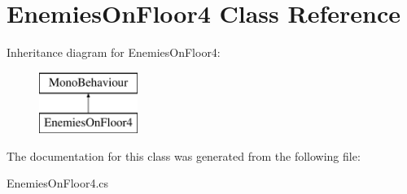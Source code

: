 \hypertarget{class_enemies_on_floor4}{}\section{Enemies\+On\+Floor4 Class Reference}
\label{class_enemies_on_floor4}
Inheritance diagram for Enemies\+On\+Floor4\+:\begin{figure}[H]
\begin{center}
\leavevmode
\includegraphics[height=2.000000cm]{class_enemies_on_floor4}
\end{center}
\end{figure}


The documentation for this class was generated from the following file\+:\begin{DoxyCompactItemize}
\item 
Enemies\+On\+Floor4.\+cs\end{DoxyCompactItemize}
